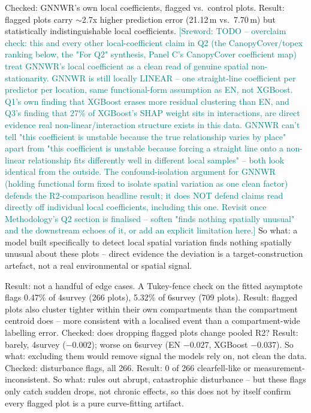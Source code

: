 \documentclass[logo,msc,ai]{infthesis}           %
\newcommand{\sr}[1]{\textcolor{teal}{[Sreword: #1]}}
\begin{document}
Checked: GNNWR's own local coefficients, flagged vs.\ control plots. Result:
flagged plots carry $\sim$2.7x higher prediction error (21.12\,m vs.\ 7.70\,m) but
statistically indistinguishable local coefficients.
\sr{TODO -- overclaim check: this and every other local-coefficient claim in Q2
(the CanopyCover/topex ranking below, the "For Q2" synthesis, Panel C's
CanopyCover coefficient map) treat GNNWR's local coefficient as a clean read of
genuine spatial non-stationarity. GNNWR is still locally LINEAR -- one straight-line
coefficient per predictor per location, same functional-form assumption as EN, not
XGBoost. Q1's own finding that XGBoost erases more residual clustering than EN,
and Q3's finding that 27\% of XGBoost's SHAP weight sits in interactions, are
direct evidence real non-linear/interaction structure exists in this data. GNNWR
can't tell "this coefficient is unstable because the true relationship varies by
place" apart from "this coefficient is unstable because forcing a straight line
onto a non-linear relationship fits differently well in different local samples"
-- both look identical from the outside. The confound-isolation argument for
GNNWR (holding functional form fixed to isolate spatial variation as one clean
factor) defends the R2-comparison headline result; it does NOT defend claims read directly
off individual local coefficients, including this one. Revisit once Methodology's
Q2 section is finalised -- soften "finds nothing spatially unusual" and the
downstream echoes of it, or add an explicit limitation here.}
So what: a model built specifically to detect local spatial variation finds
nothing spatially unusual about these plots -- direct evidence the deviation is a
target-construction artefact, not a real environmental or spatial signal.

Result: not a handful of edge cases. A Tukey-fence check on the fitted asymptote
flags 0.47\% of 4survey (266 plots), 5.32\% of 6survey (709 plots).
Result: flagged plots also cluster tighter within their own compartments than
the compartment centroid does -- more consistent with a localised event than a
compartment-wide labelling error.
Checked: does dropping flagged plots change pooled R2? Result: barely, 4survey
($-0.002$); worse on 6survey (EN $-0.027$, XGBoost $-0.037$).
So what: excluding them would remove signal the models rely on, not clean the
data.
Checked: disturbance flags, all 266. Result: 0 of 266 clearfell-like or
measurement-inconsistent.
So what: rules out abrupt, catastrophic disturbance -- but these flags only catch
sudden drops, not chronic effects, so this does not by itself confirm every
flagged plot is a pure curve-fitting artifact.
\end{document}
